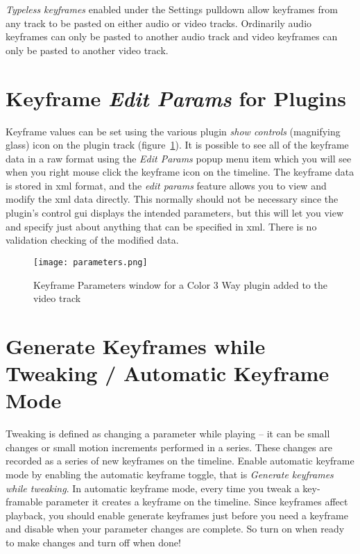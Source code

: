 \textit{Typeless keyframes} enabled under the Settings pulldown allow keyframes from any track to be pasted on either audio or video tracks.  Ordinarily audio keyframes can only be pasted to another audio track and video keyframes can only be pasted to another video track.

\section{Keyframe \textit{Edit Params} for Plugins}%
\label{sec:keyframe_edit_params_plugin}

Keyframe values can be set using the various plugin \textit{show controls} (magnifying glass) icon on the plugin track (figure~\ref{fig:parameters}).  It is possible to see all of the keyframe data in a raw format using the \textit{Edit Params} popup menu item which you will see when you right mouse click the keyframe icon on the timeline.  The keyframe data is stored in xml format, and the \textit{edit params} feature allows you to view and modify the xml data directly.  This normally should not be necessary since the plugin's control gui displays the intended parameters, but this will let you view and specify just about anything that can be specified in xml.  There is no validation checking of the modified data.

\begin{figure}[htpb]
    \centering
    \texttt{[image: parameters.png]}
    \caption{Keyframe Parameters window for a Color 3 Way plugin added to the video track}
    \label{fig:parameters}
\end{figure}

\section{Generate Keyframes while Tweaking / Automatic Keyframe Mode}%
\label{sec:generate_keyframe_tweaking}

Tweaking is defined as changing a parameter while playing -- it can be small changes or small motion increments performed in a series.  These changes are recorded as a series of new keyframes on the timeline.  Enable automatic keyframe mode by enabling the automatic keyframe toggle, that is \textit{Generate keyframes while tweaking}.  In automatic keyframe mode, every time you tweak a key-framable parameter it creates a keyframe on the timeline.  Since keyframes affect playback, you should enable generate keyframes just before you need a keyframe and disable when your parameter changes are complete.  So turn on when ready to make changes and turn off when done!

